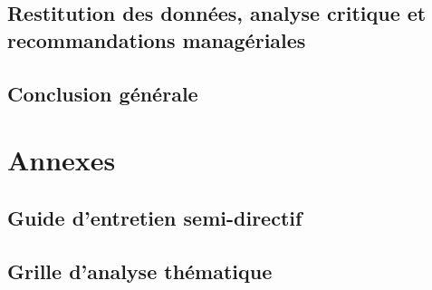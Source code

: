\documentclass{tnreport}
\begin{document}
\chapter{Restitution des données, analyse critique et recommandations managériales}


\cleardoublepage{}

\chapter*{Conclusion générale}
\setcounter{secnumdepth}{0}

\setcounter{secnumdepth}{3}
\cleardoublepage{}

\renewcommand{\tocbibname}{Bibliographie}
\nocite{*}                        %

\cleardoublepage{}

\listoftables                     %
\cleardoublepage{}

\appendix
\part*{Annexes}

\chapter{Guide d'entretien semi-directif}

\cleardoublepage{}

\chapter{Grille d'analyse thématique}

\cleardoublepage{}
\end{document}
